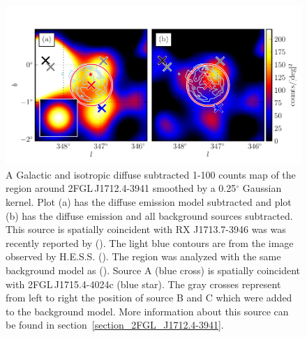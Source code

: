 \documentclass[12pt,preprint]{aastex}
\newcommand{\gev}{\text{GeV}\xspace}
\newcommand{\tev}{\text{TeV}\xspace}
\renewcommand{\deg}{\ensuremath{^\circ}\xspace}
\begin{document}
\begin{figure}
  \begin{center}
    \includegraphics[type=pdf,ext=.pdf,read=.pdf]{source_plots/source_RX_J1713.7-3946}
  \end{center}
  \caption{A Galactic and isotropic diffuse subtracted 1-100 \gev
  counts map of the region around 2FGL\,J1712.4-3941 smoothed by
  a 0.25\deg Gaussian kernel.  Plot (a) has the diffuse emission
  model subtracted and plot (b) has the diffuse emission and all
  background sources subtracted.  This source is spatially
  coincident with RX J1713.7-3946 was was recently reported by
  (\cite{rx_j1713_lat}).  The light blue contours are from the \tev image
  observed by H.E.S.S. (\cite{rx_j1713_hess}).  The region was analyzed
  with the same background model as (\cite{rx_j1713_lat}).  Source A (blue
  cross) is spatially coincident with 2FGL\,J1715.4-4024c (blue star).
  The gray crosses represent from left to right the position of source B
  and C which were added to the background model. More information about
  this source can be found in section~\ref{section_2FGL_J1712.4-3941}.
  }\label{2FGL_J1712.4-3941}
\end{figure}
\end{document}
